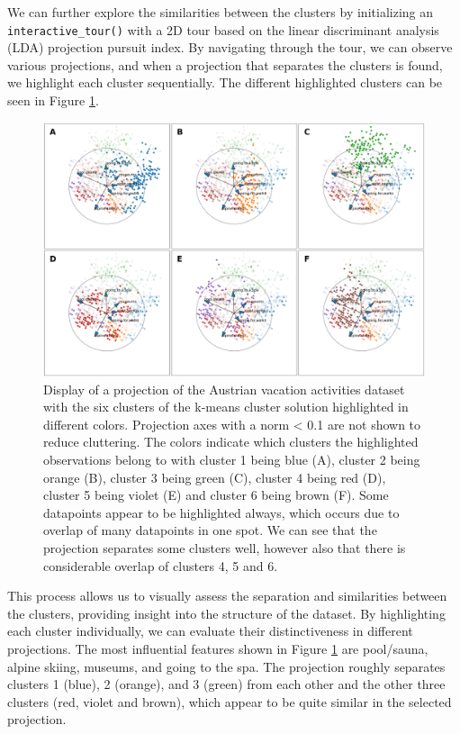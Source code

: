 \documentclass[article]{ajs}
\begin{document}
We can further explore the similarities between the clusters by initializing an \texttt{interactive\_tour()} with a 2D tour based on the linear discriminant analysis (LDA) projection pursuit index. By navigating through the tour, we can observe various projections, and when a projection that separates the clusters is found, we highlight each cluster sequentially. The different highlighted clusters can be seen in Figure \ref{fig:winter_activ_cluster_highlights}.

\begin{figure}[h!]
    \centering
    \includegraphics[width=1\textwidth]{winter_activ_cluster_highlights.png}
    \caption{Display of a projection of the Austrian vacation activities dataset with the six clusters of the k-means cluster solution highlighted in different colors. Projection axes with a norm < 0.1 are not shown to reduce cluttering. The colors indicate which clusters the highlighted observations belong to with cluster 1 being blue (A), cluster 2 being orange (B), cluster 3 being green (C), cluster 4 being red (D), cluster 5 being violet (E) and cluster 6 being brown (F). Some datapoints appear to be highlighted always, which occurs due to overlap of many datapoints in one spot. We can see that the projection separates some clusters well, however also that there is considerable overlap of clusters 4, 5 and 6.}
    \label{fig:winter_activ_cluster_highlights}
\end{figure}

This process allows us to visually assess the separation and similarities between the clusters, providing insight into the structure of the dataset. By highlighting each cluster individually, we can evaluate their distinctiveness in different projections. The most influential features shown in Figure \ref{fig:winter_activ_cluster_highlights} are pool/sauna, alpine skiing, museums, and going to the spa. The projection roughly separates clusters 1 (blue), 2 (orange), and 3 (green) from each other and the other three clusters (red, violet and brown), which appear to be quite similar in the selected projection. 
\end{document}
